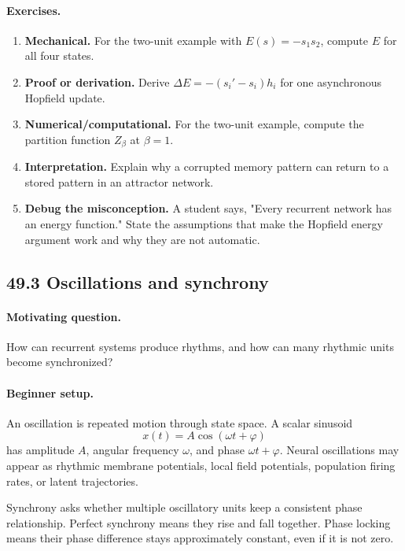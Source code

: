 \paragraph{Exercises.}
\begin{enumerate}[label=\textbf{49.2.\arabic*.}, leftmargin=*]
\item \textbf{Mechanical.} For the two-unit example with \(E(s)=-s_1s_2\), compute \(E\) for all four states.
\item \textbf{Proof or derivation.} Derive \(\Delta E=-(s_i'-s_i)h_i\) for one asynchronous Hopfield update.
\item \textbf{Numerical/computational.} For the two-unit example, compute the partition function \(Z_\beta\) at \(\beta=1\).
\item \textbf{Interpretation.} Explain why a corrupted memory pattern can return to a stored pattern in an attractor network.
\item \textbf{Debug the misconception.} A student says, "Every recurrent network has an energy function." State the assumptions that make the Hopfield energy argument work and why they are not automatic.
\end{enumerate}

\subsection{49.3 Oscillations and synchrony}

\paragraph{Motivating question.}
How can recurrent systems produce rhythms, and how can many rhythmic units become synchronized?

\paragraph{Beginner setup.}
An oscillation is repeated motion through state space. A scalar sinusoid
\[
x(t)=A\cos(\omega t+\varphi)
\]
has amplitude \(A\), angular frequency \(\omega\), and phase \(\omega t+\varphi\). Neural oscillations may appear as rhythmic membrane potentials, local field potentials, population firing rates, or latent trajectories.

Synchrony asks whether multiple oscillatory units keep a consistent phase relationship. Perfect synchrony means they rise and fall together. Phase locking means their phase difference stays approximately constant, even if it is not zero.

